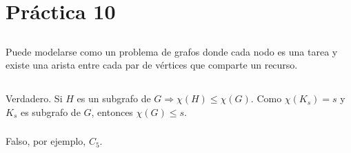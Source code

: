 \section{Práctica 10}

\setcounter{subsection}{1}
\subsection{}
Puede modelarse como un problema de grafos donde cada nodo es una tarea y existe una arista entre cada par de vértices que comparte un recurso.

\subsection{}
\subsubsection{}
Verdadero. Si $H$ es un subgrafo de $G \Longrightarrow \chi(H) \leq \chi(G)$. Como $\chi(K_s) = s$ y $K_s$ es subgrafo de $G$, entonces $\chi(G) \leq s$.

\subsubsection{}
Falso, por ejemplo, $C_5$.